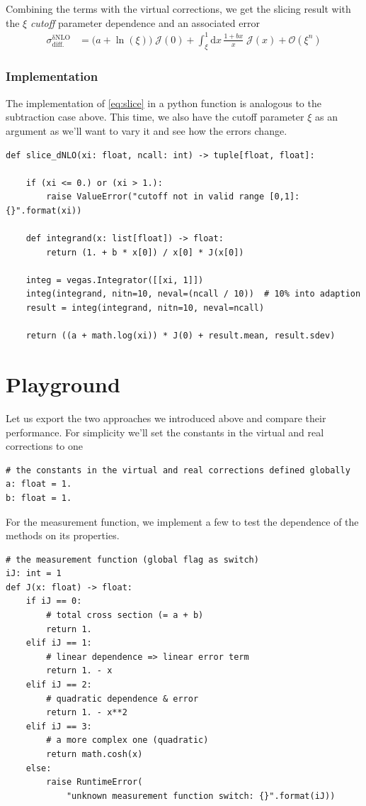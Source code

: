 \documentclass[11pt]{article}
\begin{document}
Combining the terms with the virtual corrections, we get the slicing result with the \(\xi\) \emph{cutoff} parameter
dependence and an associated error
\begin{align}
\label{eq:slice}
  \sigma^\mathrm{\delta NLO}_\mathrm{diff.}
  &=
  \bigl(a + \ln(\xi)\bigr) \;\mathcal{J}(0)
  +\int_\xi^1\mathrm{d}x\,\frac{1+bx}{x}
  \;\mathcal{J}(x)
  + \mathcal{O}(\xi^n)
\end{align}
\subsubsection{Implementation}
\label{sec:orga3cc207}
The implementation of \eqref{eq:slice} in a python function is analogous to the subtraction case above.
This time, we also have the cutoff parameter \(\xi\) as an argument as we'll want to vary it and see how the errors change.
\begin{verbatim}
def slice_dNLO(xi: float, ncall: int) -> tuple[float, float]:

    if (xi <= 0.) or (xi > 1.):
        raise ValueError("cutoff not in valid range [0,1]: {}".format(xi))

    def integrand(x: list[float]) -> float:
        return (1. + b * x[0]) / x[0] * J(x[0])

    integ = vegas.Integrator([[xi, 1]])
    integ(integrand, nitn=10, neval=(ncall / 10))  # 10% into adaption
    result = integ(integrand, nitn=10, neval=ncall)

    return ((a + math.log(xi)) * J(0) + result.mean, result.sdev)
\end{verbatim}
\section{Playground}
\label{sec:org668a1e5}
Let us export the two approaches we introduced above and compare their performance.
For simplicity we'll set the constants in the virtual and real corrections to one
\begin{verbatim}
# the constants in the virtual and real corrections defined globally
a: float = 1.
b: float = 1.
\end{verbatim}
For the measurement function, we implement a few to test the dependence of the methods on its properties.
\begin{verbatim}
# the measurement function (global flag as switch)
iJ: int = 1
def J(x: float) -> float:
    if iJ == 0:
        # total cross section (= a + b)
        return 1.
    elif iJ == 1:
        # linear dependence => linear error term
        return 1. - x
    elif iJ == 2:
        # quadratic dependence & error
        return 1. - x**2
    elif iJ == 3:
        # a more complex one (quadratic)
        return math.cosh(x)
    else:
        raise RuntimeError(
            "unknown measurement function switch: {}".format(iJ))
\end{verbatim}
\end{document}
